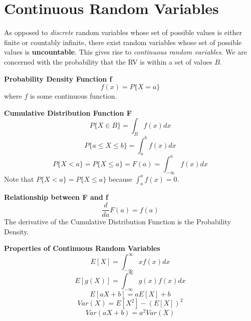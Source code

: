 \documentclass[10pt,a4paper]{article}
\begin{document}
    \section{Continuous Random Variables}
    As opposed to \emph{discrete} random variables whose set of possible values is either finite or countably infinite,  there exist random variables whose set of possible values is \textbf{uncountable}. This gives rise to \emph{continuous random variables}. We are concerned with the probability that the RV is within a set of values $B$.
    \begin{framed}
    	\centering\textbf{Probability Density Function f}
    	$$f(x) = P\{X=a\}$$
    	where $f$ is some continuous function.
    \end{framed}
    
    \begin{framed}
    	\centering\textbf{Cumulative Distribution Function F}
    	 $$P\{X\in B\} = \int_{B}f(x) dx$$      
    	 $$P\{a \leq X \leq b\} = \int_a^bf(x)dx$$
        $$P\{X < a\} = P\{X \leq a\} = F(a) = \int_{-\infty}^{a}f(x)dx$$
        Note that $P\{X < a\} = P\{X \leq a\}$ because $\int_{a}^{a}f(x) = 0$.
    \end{framed}
    \begin{framed}
    	\centering\textbf{Relationship between F and f}
    	$$\frac{d}{da}F(a) = f(a) $$
    	The derivative of the Cumulative Distribution Function is the Probability Density.
    \end{framed}
    \begin{framed}
    	\centering\textbf{Properties of Continuous Random Variables}
    	$$E[X] = \int_{-\infty}^{\infty}xf(x)dx$$
    	$$E[g(X)] = \int_{-\infty}^{\infty}g(x)f(x) dx$$
    	$$E[aX+b] = aE[X] + b$$
    	$$Var(X) = E[X^{2}]-(E[X])^{2}$$
    	$$Var(aX + b) = a^{2}Var(X)$$
    \end{framed}
    \newpage 
\end{document}

